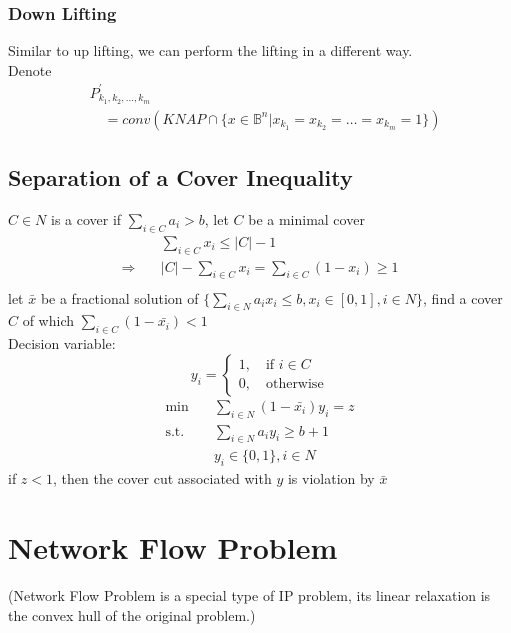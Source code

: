				\subsubsection{Down Lifting}
					Similar to up lifting, we can perform the lifting in a different way.\\
					Denote
					\begin{align}
						&P_{k_1, k_2, ..., k_m}^{'} \\
						&\quad =conv(KNAP\cap \{x\in \mathbb{B}^{n}|x_{k_1}=x_{k_2}=\dots=x_{k_m}=1\}) 
					\end{align}

			\subsection{Separation of a Cover Inequality}
				$C\in N$ is a cover if $\sum_{i\in C} a_i > b$, let $C$ be a minimal cover
				\begin{align}
					&\sum_{i\in C}x_i \le |C| - 1 \\
					\Rightarrow \quad & |C| - \sum_{i\in C}x_i = \sum_{i \in C}(1-x_i)\ge 1 \\
				\end{align}
				let $\bar{x}$ be a fractional solution of $\{\sum_{i\in N} a_ix_i \le b, x_i \in [0, 1], i\in N\}$, find a cover $C$ of which $\sum_{i\in C}(1-\bar{x_i})<1$\\
				Decision variable:
				\begin{equation}
					y_i = \begin{cases}1, \quad \text{if } i\in C\\ 0, \quad \text{otherwise}\end{cases}
				\end{equation}
				\begin{align}
					\min \quad & \sum_{i\in N} (1-\bar{x_i})y_i = z \\
					\text{s.t.} \quad & \sum_{i\in N}a_iy_i \ge b+1 \\
					&y_i \in \{0, 1\}, i\in N
				\end{align}
				if $z<1$, then the cover cut associated with $y$ is violation by $\bar{x}$

		\section{Network Flow Problem}
			(Network Flow Problem is a special type of IP problem, its linear relaxation is the convex hull of the original problem.)
